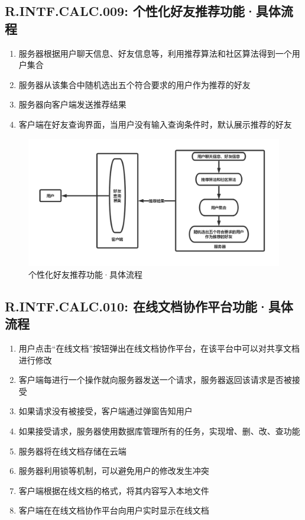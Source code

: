    \subsection{R.INTF.CALC.009: 个性化好友推荐功能·具体流程}
    \begin{enumerate}
        \item 服务器根据用户聊天信息、好友信息等，利用推荐算法和社区算法得到一个用户集合
        \item 服务器从该集合中随机选出五个符合要求的用户作为推荐的好友
        \item 服务器向客户端发送推荐结果
        \item 客户端在好友查询界面，当用户没有输入查询条件时，默认展示推荐的好友
    \end{enumerate}
        \begin{figure}[h]
            \centering
            \includegraphics[scale=0.4]{OutlineDesign/figures/个性化好友推荐功能·具体流程.png}
            \caption{个性化好友推荐功能·具体流程}
            \label{fig:server_flow}
        \end{figure}
    \subsection{R.INTF.CALC.010: 在线文档协作平台功能·具体流程}
    \begin{enumerate}
        \item 用户点击“在线文档”按钮弹出在线文档协作平台，在该平台中可以对共享文档 进行修改
        \item 客户端每进行一个操作就向服务器发送一个请求，服务器返回该请求是否被接受
        \item 如果请求没有被接受，客户端通过弹窗告知用户
        \item 如果接受请求，服务器使用数据库管理所有的任务，实现增、删、改、查功能
        \item 服务器将在线文档存储在云端
        \item 服务器利用锁等机制，可以避免用户的修改发生冲突
        \item 客户端根据在线文档的格式，将其内容写入本地文件
        \item 客户端在在线文档协作平台向用户实时显示在线文档
    \end{enumerate}
    
